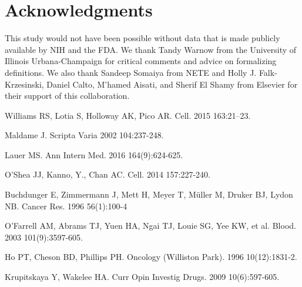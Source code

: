 \documentclass[10pt,letterpaper]{article}
\begin{document}
\nolinenumbers
 
\section*{Acknowledgments} This study would not have been possible without data that is made publicly available by NIH and the FDA. We thank Tandy Warnow from the University of Illinois Urbana-Champaign for critical comments and advice on formalizing definitions. We also thank Sandeep Somaiya from NETE and Holly J. Falk-Krzesinski, Daniel Calto, M'hamed Aisati, and Sherif El Shamy from Elsevier for their support of this collaboration.
 
\begin{thebibliography}{10}

Williams RS, Lotia S, Holloway AK, Pico AR.
\newblock Cell. 2015 163:21--23.

Maldame J.
\newblock Scripta Varia 2002 104:237-248.

Lauer MS.
\newblock Ann Intern Med. 2016 164(9):624-625.

O'Shea JJ, Kanno, Y., Chan AC.
\newblock Cell. 2014 157:227-240.

Buchdunger E, Zimmermann J, Mett H, Meyer T, M\"uller M, Druker BJ, Lydon NB.
\newblock Cancer Res. 1996 56(1):100-4

O'Farrell AM, Abrams TJ, Yuen HA, Ngai TJ, Louie SG, Yee KW, et al. 
\newblock Blood. 2003 101(9):3597-605.

Ho PT, Cheson BD, Phillips PH.
\newblock Oncology (Williston Park). 1996 10(12):1831-2.

Krupitskaya Y, Wakelee HA.
\newblock Curr Opin Investig Drugs. 2009 10(6):597-605.


\end{thebibliography}
\end{document}
